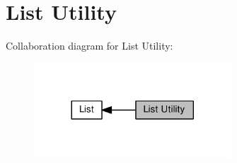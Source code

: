 \hypertarget{group__list__util}{}\section{List Utility}
\label{group__list__util}
Collaboration diagram for List Utility\+:\nopagebreak
\begin{figure}[H]
\begin{center}
\leavevmode
\includegraphics[width=209pt]{group__list__util}
\end{center}
\end{figure}
